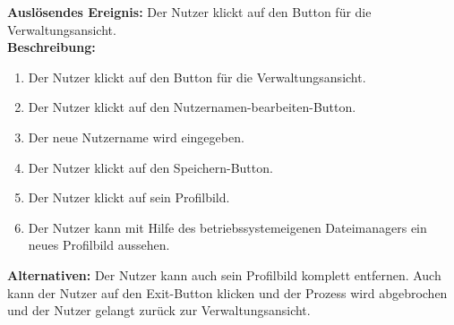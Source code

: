 \documentclass[parskip=full]{scrartcl}
\begin{document}
\textbf{Auslösendes Ereignis:} Der Nutzer klickt auf den Button für die Verwaltungsansicht.\\
\textbf{Beschreibung:}
\begin{enumerate}
    \item Der Nutzer klickt auf den Button für die Verwaltungsansicht.
    \item Der Nutzer klickt auf den Nutzernamen-bearbeiten-Button.
    \item Der neue Nutzername wird eingegeben.
    \item Der Nutzer klickt auf den Speichern-Button.
    \item Der Nutzer klickt auf sein Profilbild.
    \item Der Nutzer kann mit Hilfe des betriebssystemeigenen Dateimanagers ein neues Profilbild aussehen.
\end{enumerate}
\textbf{Alternativen:} Der Nutzer kann auch sein Profilbild komplett entfernen. Auch kann der Nutzer auf den Exit-Button klicken und der Prozess wird abgebrochen und der Nutzer gelangt zurück zur Verwaltungsansicht.\\
\newpage
\end{document}
